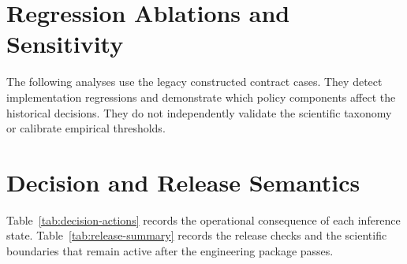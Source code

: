 \documentclass[preprint,12pt]{elsarticle}
\begin{document}



\section{Regression Ablations and Sensitivity}

The following analyses use the legacy constructed contract cases. They detect implementation regressions and demonstrate which policy components affect the historical decisions. They do not independently validate the scientific taxonomy or calibrate empirical thresholds.




\section{Decision and Release Semantics}

Table~\ref{tab:decision-actions} records the operational consequence of each inference state. Table~\ref{tab:release-summary} records the release checks and the scientific boundaries that remain active after the engineering package passes.



\end{document}
